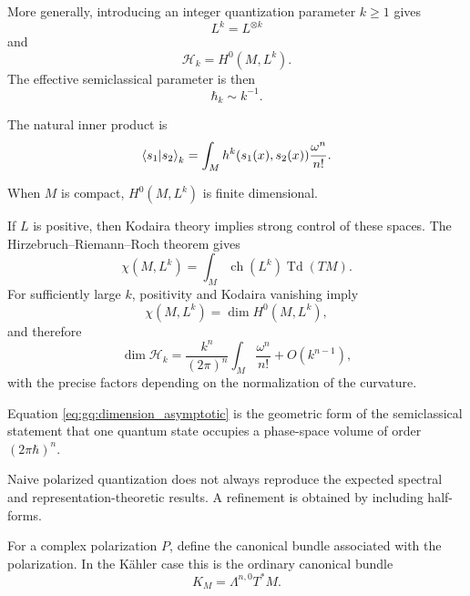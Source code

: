 \documentclass[a4paper,11pt]{article}
\theoremstyle{definition}
\newcommand{\cH}{\mathcal{H}}
\begin{document}
More generally, introducing an integer quantization parameter $k\geq1$ gives
\begin{equation}
    L^k=L^{\otimes k}
\end{equation}
and
\begin{equation}
    \boxed{
    \cH_k
    =
    H^0(M,L^k).
    }
    \label{eq:gq:Hk}
\end{equation}
The effective semiclassical parameter is then
\begin{equation}
    \hbar_k\sim k^{-1}.
\end{equation}

The natural inner product is
\begin{equation}
    \braket{s_1|s_2}_k
    =
    \int_M
    h^k(s_1(x),s_2(x))
    \frac{\omega^n}{n!}.
    \label{eq:gq:Hilbert_inner_product}
\end{equation}

When $M$ is compact, $H^0(M,L^k)$ is finite dimensional.

If $L$ is positive, then Kodaira theory implies strong control of these spaces.
The Hirzebruch--Riemann--Roch theorem gives
\begin{equation}
    \chi(M,L^k)
    =
    \int_M
    \operatorname{ch}(L^k)
    \operatorname{Td}(TM).
\end{equation}
For sufficiently large $k$, positivity and Kodaira vanishing imply
\begin{equation}
    \chi(M,L^k)
    =
    \dim H^0(M,L^k),
\end{equation}
and therefore
\begin{equation}
    \dim \cH_k
    =
    \frac{k^n}{(2\pi)^n}
    \int_M\frac{\omega^n}{n!}
    +
    O(k^{n-1}),
    \label{eq:gq:dimension_asymptotic}
\end{equation}
with the precise factors depending on the normalization of the curvature.

Equation \eqref{eq:gq:dimension_asymptotic} is the geometric form of the
semiclassical statement that one quantum state occupies a phase-space volume
of order $(2\pi\hbar)^n$.

Naive polarized quantization does not always reproduce the expected spectral
and representation-theoretic results.  A refinement is obtained by including
half-forms.

For a complex polarization $P$, define the canonical bundle associated with
the polarization.  In the K\"ahler case this is the ordinary canonical bundle
\begin{equation}
    K_M
    =
    \Lambda^{n,0}T^*M.
\end{equation}
\end{document}
